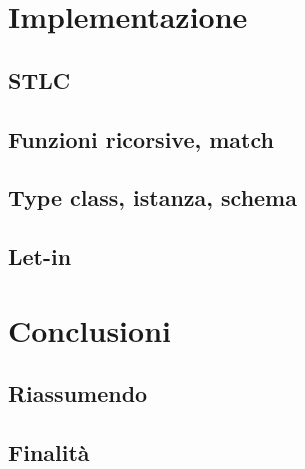 \documentclass[12pt,a4paper,openright,twoside]{report}
\begin{document}
\clearpage{\pagestyle{empty}\cleardoublepage}	%


\chapter{Implementazione}		%

\lhead[\fancyplain{}{\bfseries\thepage}]{\fancyplain{}{\bfseries\rightmark}}	%


\section{STLC}

\section{Funzioni ricorsive, match}

\section{Type class, istanza, schema}

\section{Let-in}

\clearpage{\pagestyle{empty}\cleardoublepage}		%


\chapter{Conclusioni}		%



\section{Riassumendo}

\section{Finalità}
\end{document}
